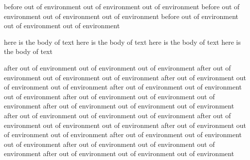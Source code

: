 before out of environment out of environment out of environment
before out of environment out of environment out of environment
before out of environment out of environment out of environment
\begin{myenvironment}
  here is the body of text
  here is the body of text
  here is the body of text
  here is the body of text
\end{myenvironment}
after out of environment out of environment out of environment
after out of environment out of environment out of environment
after out of environment out of environment out of environment
after out of environment out of environment out of environment
after out of environment out of environment out of environment
after out of environment out of environment out of environment
after out of environment out of environment out of environment
after out of environment out of environment out of environment
after out of environment out of environment out of environment
after out of environment out of environment out of environment
after out of environment out of environment out of environment
after out of environment out of environment out of environment
